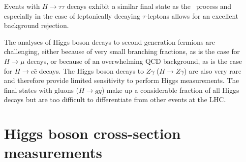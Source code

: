 Events with $H \to \tau\tau $ decays exhibit a similar final state as the \HWW\ process and especially in the case of leptonically decaying $\tau$-leptons allows for an excellent background rejection. 

The analyses of Higgs boson decays to second generation fermions are challenging, either because of very small branching fractions, as is the case for $H \to \mu$ decays, or because of an overwhelming QCD background, as is the case for $H \to c\bar{c}$ decays.
The Higgs boson decays to $Z\gamma$ ($H \to Z\gamma$) are also very rare and therefore provide limited sensitivity to perform Higgs measurements.
The final states with gluons ($H \to gg$) make up a considerable fraction of all Higgs decays but are too difficult to differentiate from other events at the LHC.


\section{Higgs boson cross-section measurements}
\label{subsec:xsec-measurements}



